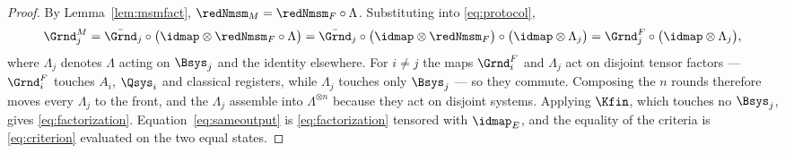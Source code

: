 \begin{proof}
By Lemma~\ref{lem:msmfact}, $\redNmsm_M=\redNmsm_F\circ\Lambda$. Substituting into
\eqref{eq:protocol},
\begin{equation*}
  \Grnd^{M}_j
  =\bar{\Grnd}_j\circ\big(\idmap\otimes\redNmsm_F\circ\Lambda\big)
  =\bar{\Grnd}_j\circ\big(\idmap\otimes\redNmsm_F\big)\circ\big(\idmap\otimes\Lambda_j\big)
  =\Grnd^{F}_j\circ\big(\idmap\otimes\Lambda_j\big),
\end{equation*}
where $\Lambda_j$ denotes $\Lambda$ acting on $\Bsys_j$ and the identity
elsewhere. For $i\ne j$ the maps $\Grnd^{F}_i$ and $\Lambda_j$ act on disjoint
tensor factors --- $\Grnd^{F}_i$ touches $A_i$, $\Qsys_i$ and classical
registers, while $\Lambda_j$ touches only $\Bsys_j$ --- so they commute.
Composing the $n$ rounds therefore moves every $\Lambda_j$ to the front, and
the $\Lambda_j$ assemble into $\Lambda^{\otimes n}$ because they act on
disjoint systems. Applying $\Kfin$, which touches no $\Bsys_j$, gives
\eqref{eq:factorization}. Equation~\eqref{eq:sameoutput} is
\eqref{eq:factorization} tensored with $\idmap_E$, and the equality of the
criteria is \eqref{eq:criterion} evaluated on the two equal states.
\end{proof}
